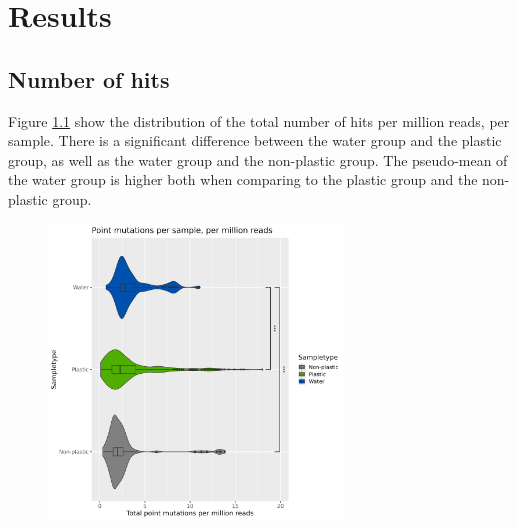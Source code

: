 \chapter{Results}


\section{Number of hits}
Figure \ref{hits_type} show the distribution of the total number of hits per million reads, per sample. There is a significant difference between the water group and the plastic group, as well as the water group and the non-plastic group. The pseudo-mean of the water group is higher both when comparing to the plastic group and the non-plastic group.

\begin{figure}[h]
    \centering
    \includegraphics[width = 0.7\textwidth]{figure/hits_per_million_type.png}
    \caption{}
    \label{hits_type}
\end{figure}

